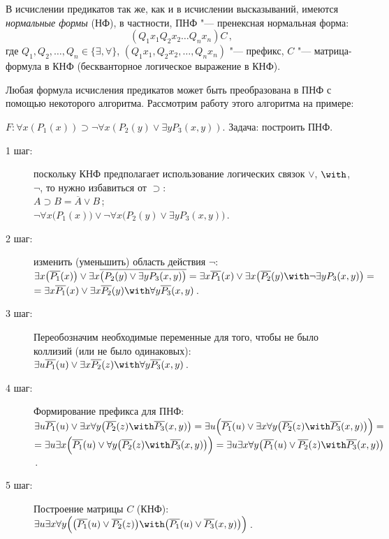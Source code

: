 В исчислении предикатов так же, как и в исчислении высказываний,
имеются \emph{нормальные формы} (НФ), в частности, ПНФ "--- пренексная
нормальная форма:
\begin{equation} (Q_1x_1Q_2x_2 \ldots Q_nx_n)C\,,
\end{equation} где $Q_1,Q_2,\ldots,Q_n \in \{\exists,\forall\}$,
$(Q_1x_1,Q_2x_2,\ldots,Q_nx_n)$ "--- префикс, $C$ "--- матрица-формула в
КНФ (бескванторное логическое выражение в КНФ).

Любая формула исчисления предикатов может быть преобразована в ПНФ с
помощью некоторого алгоритма. Рассмотрим работу этого алгоритма на
примере:
\begin{ex} $F\colon \forall{x}(P_1(x)) \supset \lnot\forall{x}(P_2(y)
\lor \exists{y}P_3(x,y))$. Задача: построить ПНФ.
  \begin{description}
    \item[1 шаг:] поскольку КНФ предполагает использование логических
связок $\lor$, $\with$, $\lnot$, то нужно избавиться от $\supset$:\\
$A \supset B = \overline{A} \lor B$\,;\\
$\lnot\forall{x}\bigl(P_1(x)\bigr) \lor \lnot\forall{x}\bigl(P_2(y)
\lor \exists{y}P_3(x,y)\bigr)$\,.
    \item[2 шаг:] изменить (уменьшить) область действия $\lnot$:\\
$\exists{x}\bigl(\overline{P_1}(x)\bigr) \lor
\exists{x}\overline{\bigl(P_2(y)\lor\exists{y}P_3(x,y)\bigr)} =
\exists{x}\overline{P_1}(x) \lor
\exists{x}\bigl(\overline{P_2}(y)\with\lnot\exists{y}P_3(x,y)\bigr)
=$\\ $=\exists{x}\overline{P_1}(x) \lor \exists{x}\overline{P_2}(y)
\with \forall{y}\overline{P_3}(x,y)$\,.
    \item[3 шаг:] Переобозначим необходимые переменные для того, чтобы
не было коллизий (или не было одинаковых):\\
$\exists{u}\overline{P_1}(u) \lor \exists{x}\overline{P_2}(z) \with
\forall{y}\overline{P_3}(x,y)$\,.
    \item[4 шаг:] Формирование префикса для ПНФ:\\
$\exists{u}\overline{P_1}(u) \lor
\exists{x}\forall{y}\bigl(\overline{P_2}(z) \with
\overline{P_3}(x,y)\bigr) = \exists{u}\Bigl(\overline{P_1}(u) \lor
\exists{x}\forall{y}\bigl(\overline{P_2}(z) \with
\overline{P_3}(x,y)\bigr)\Bigr)=$\\ $=\exists{u}\exists{x}
\Bigl(\overline{P_1}(u) \lor \forall{y}\bigl(\overline{P_2}(z) \with
\overline{P_3}(x,y)\bigr)\Bigr) = \exists{u}\exists{x}\forall{y}
\bigl(\overline{P_1}(u) \lor \overline{P_2}(z) \with
\overline{P_3}(x,y)\bigr)$\,.
    \item[5 шаг:] Построение матрицы $C$ (КНФ):\\
$\exists{u}\exists{x}\forall{y}\Bigl(\bigl(\overline{P_1}(u) \lor
\overline{P_2}(z)\bigr) \with \bigl(\overline{P_1}(u) \lor
\overline{P_3}(x,y)\bigr)\Bigr)$\,.
  \end{description}
\end{ex}

